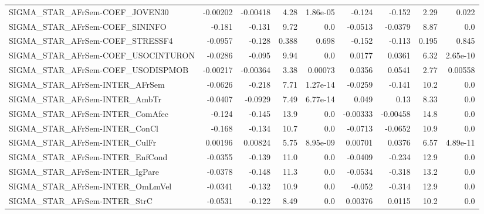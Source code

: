 \begin{tabular}{lrrrrrrrr}
SIGMA\_STAR\_AFrSem-COEF\_JOVEN30         &    -0.00202 &     -0.00418 &    4.28 & 1.86e-05 &     -0.124 &      -0.152 &         2.29 &         0.022 \\
SIGMA\_STAR\_AFrSem-COEF\_SININFO         &      -0.181 &       -0.131 &    9.72 &      0.0 &    -0.0513 &     -0.0379 &         8.87 &           0.0 \\
SIGMA\_STAR\_AFrSem-COEF\_STRESSF4        &     -0.0957 &       -0.128 &   0.388 &    0.698 &     -0.152 &      -0.113 &        0.195 &         0.845 \\
SIGMA\_STAR\_AFrSem-COEF\_USOCINTURON     &     -0.0286 &       -0.095 &    9.94 &      0.0 &     0.0177 &      0.0361 &         6.32 &      2.65e-10 \\
SIGMA\_STAR\_AFrSem-COEF\_USODISPMOB      &    -0.00217 &     -0.00364 &    3.38 &  0.00073 &     0.0356 &      0.0541 &         2.77 &       0.00558 \\
SIGMA\_STAR\_AFrSem-INTER\_AFrSem         &     -0.0626 &       -0.218 &    7.71 & 1.27e-14 &    -0.0259 &      -0.141 &         10.2 &           0.0 \\
SIGMA\_STAR\_AFrSem-INTER\_AmbTr          &     -0.0407 &      -0.0929 &    7.49 & 6.77e-14 &      0.049 &        0.13 &         8.33 &           0.0 \\
SIGMA\_STAR\_AFrSem-INTER\_ComAfec        &      -0.124 &       -0.145 &    13.9 &      0.0 &   -0.00333 &    -0.00458 &         14.8 &           0.0 \\
SIGMA\_STAR\_AFrSem-INTER\_ConCl          &      -0.168 &       -0.134 &    10.7 &      0.0 &    -0.0713 &     -0.0652 &         10.9 &           0.0 \\
SIGMA\_STAR\_AFrSem-INTER\_CulFr          &     0.00196 &      0.00824 &    5.75 & 8.95e-09 &    0.00701 &      0.0376 &         6.57 &      4.89e-11 \\
SIGMA\_STAR\_AFrSem-INTER\_EnfCond        &     -0.0355 &       -0.139 &    11.0 &      0.0 &    -0.0409 &      -0.234 &         12.9 &           0.0 \\
SIGMA\_STAR\_AFrSem-INTER\_IgPare         &     -0.0378 &       -0.148 &    11.3 &      0.0 &    -0.0534 &      -0.318 &         13.2 &           0.0 \\
SIGMA\_STAR\_AFrSem-INTER\_OmLmVel        &     -0.0341 &       -0.132 &    10.9 &      0.0 &     -0.052 &      -0.314 &         12.9 &           0.0 \\
SIGMA\_STAR\_AFrSem-INTER\_StrC           &     -0.0531 &       -0.122 &    8.49 &      0.0 &    0.00376 &      0.0115 &         10.2 &           0.0 \\

\end{tabular}

